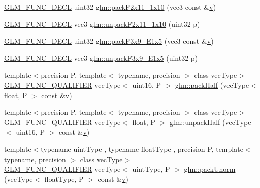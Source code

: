 \begin{DoxyCompactItemize}
\item 
\mbox{\hyperlink{setup_8hpp_ab2d052de21a70539923e9bcbf6e83a51}{G\+L\+M\+\_\+\+F\+U\+N\+C\+\_\+\+D\+E\+CL}} uint32 \mbox{\hyperlink{group__gtc__packing_ga8c2a0eeee677ca4dafd9e093d9e81062}{glm\+::pack\+F2x11\+\_\+1x10}} (vec3 const \&\mbox{\hyperlink{glad_8h_a14cfbe2fc2234f5504618905b69d1e06}{v}})
\item 
\mbox{\hyperlink{setup_8hpp_ab2d052de21a70539923e9bcbf6e83a51}{G\+L\+M\+\_\+\+F\+U\+N\+C\+\_\+\+D\+E\+CL}} vec3 \mbox{\hyperlink{group__gtc__packing_ga8b9c7991eb021d95c778bf5c0b2f7824}{glm\+::unpack\+F2x11\+\_\+1x10}} (uint32 p)
\item 
\mbox{\hyperlink{setup_8hpp_ab2d052de21a70539923e9bcbf6e83a51}{G\+L\+M\+\_\+\+F\+U\+N\+C\+\_\+\+D\+E\+CL}} uint32 \mbox{\hyperlink{group__gtc__packing_ga0984f9598edc648d59a9643d9a61b121}{glm\+::pack\+F3x9\+\_\+\+E1x5}} (vec3 const \&\mbox{\hyperlink{glad_8h_a14cfbe2fc2234f5504618905b69d1e06}{v}})
\item 
\mbox{\hyperlink{setup_8hpp_ab2d052de21a70539923e9bcbf6e83a51}{G\+L\+M\+\_\+\+F\+U\+N\+C\+\_\+\+D\+E\+CL}} vec3 \mbox{\hyperlink{group__gtc__packing_ga15d8845a31e1e55d493803d0c8cb5910}{glm\+::unpack\+F3x9\+\_\+\+E1x5}} (uint32 p)
\item 
{\footnotesize template$<$precision P, template$<$ typename, precision $>$ class vec\+Type$>$ }\\\mbox{\hyperlink{setup_8hpp_a33fdea6f91c5f834105f7415e2a64407}{G\+L\+M\+\_\+\+F\+U\+N\+C\+\_\+\+Q\+U\+A\+L\+I\+F\+I\+ER}} vec\+Type$<$ uint16, P $>$ \mbox{\hyperlink{group__gtc__packing_ga896d806b72e390eb953786cca3632ec9}{glm\+::pack\+Half}} (vec\+Type$<$ float, P $>$ const \&\mbox{\hyperlink{glad_8h_a14cfbe2fc2234f5504618905b69d1e06}{v}})
\item 
{\footnotesize template$<$precision P, template$<$ typename, precision $>$ class vec\+Type$>$ }\\\mbox{\hyperlink{setup_8hpp_a33fdea6f91c5f834105f7415e2a64407}{G\+L\+M\+\_\+\+F\+U\+N\+C\+\_\+\+Q\+U\+A\+L\+I\+F\+I\+ER}} vec\+Type$<$ float, P $>$ \mbox{\hyperlink{group__gtc__packing_gaf3f9387834f8d8beadfe723c1dd247a7}{glm\+::unpack\+Half}} (vec\+Type$<$ uint16, P $>$ const \&\mbox{\hyperlink{glad_8h_a14cfbe2fc2234f5504618905b69d1e06}{v}})
\item 
{\footnotesize template$<$typename uint\+Type , typename float\+Type , precision P, template$<$ typename, precision $>$ class vec\+Type$>$ }\\\mbox{\hyperlink{setup_8hpp_a33fdea6f91c5f834105f7415e2a64407}{G\+L\+M\+\_\+\+F\+U\+N\+C\+\_\+\+Q\+U\+A\+L\+I\+F\+I\+ER}} vec\+Type$<$ uint\+Type, P $>$ \mbox{\hyperlink{group__gtc__packing_gacb9a3df68172c1193c9d701a3fa4d88b}{glm\+::pack\+Unorm}} (vec\+Type$<$ float\+Type, P $>$ const \&\mbox{\hyperlink{glad_8h_a14cfbe2fc2234f5504618905b69d1e06}{v}})

\end{DoxyCompactItemize}
